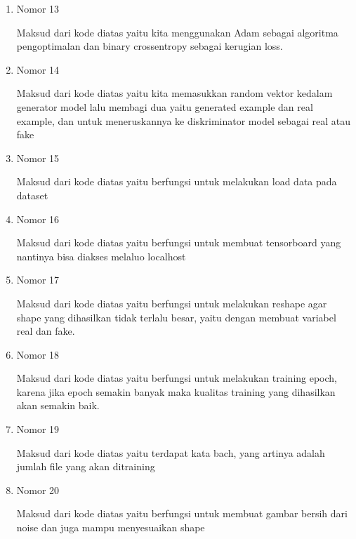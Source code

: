 \begin{enumerate}
\item Nomor 13\\
\hfill\break
	
Maksud dari kode diatas yaitu kita menggunakan Adam sebagai algoritma pengoptimalan dan binary crossentropy sebagai kerugian loss.

\item Nomor 14\\
\hfill\break
	
Maksud dari kode diatas yaitu kita memasukkan random vektor kedalam generator model lalu membagi dua yaitu generated example dan real example, dan untuk meneruskannya ke diskriminator model sebagai real atau fake

\item Nomor 15\\
\hfill\break
	
Maksud dari kode diatas yaitu berfungsi untuk melakukan load data pada dataset

\item Nomor 16\\
\hfill\break
	
Maksud dari kode diatas yaitu berfungsi untuk membuat tensorboard yang nantinya bisa diakses melaluo localhost

\item Nomor 17\\
\hfill\break
	
Maksud dari kode diatas yaitu berfungsi untuk melakukan reshape agar shape yang dihasilkan tidak terlalu besar, yaitu dengan membuat variabel real dan fake.

\item Nomor 18\\
\hfill\break
	
Maksud dari kode diatas yaitu berfungsi untuk melakukan training epoch, karena jika epoch semakin banyak maka kualitas training yang dihasilkan akan semakin baik.

\item Nomor 19\\
\hfill\break
	
Maksud dari kode diatas yaitu terdapat kata bach, yang artinya adalah jumlah file yang akan ditraining

\item Nomor 20\\
\hfill\break
	
Maksud dari kode diatas yaitu berfungsi untuk membuat gambar bersih dari noise dan juga mampu menyesuaikan shape


\end{enumerate}
